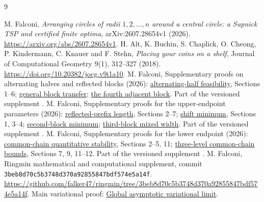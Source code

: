 \documentclass[11pt]{article}
\theoremstyle{definition}\newtheorem{definition}[theorem]{Definition}
\theoremstyle{remark}\newtheorem{remark}[theorem]{Remark}
\begin{document}
\begin{thebibliography}{9}
\small\raggedright
{} M. Falconi, \emph{Arranging circles of radii $1,2,\ldots,n$
around a central circle: a Supnick TSP and certified finite optima},
arXiv:2607.28654v1 (2026).
\url{https://arxiv.org/abs/2607.28654v1}.
 H. Alt, K. Buchin, S. Chaplick, O. Cheong, P. Kindermann,
C. Knauer and F. Stehn, \emph{Placing your coins on a shelf}, Journal of
Computational Geometry 9(1), 312--327 (2018).
\url{https://doi.org/10.20382/jocg.v9i1a10}.
 M. Falconi, Supplementary proofs on alternating halves and
reflected blocks (2026):
\href{https://github.com/falker47/ringmin/blob/3beb8d70c5b3748d370a92855847bdf574e5a14f/research/PERMUTED_ALTERNATING_HALVES.md}{alternating-half feasibility}, Sections 1--6;
\href{https://github.com/falker47/ringmin/blob/3beb8d70c5b3748d370a92855847bdf574e5a14f/research/PERMUTED_HALVES_GENERAL_BLOCK_TRANSFER.md}{general block transfer};
\href{https://github.com/falker47/ringmin/blob/3beb8d70c5b3748d370a92855847bdf574e5a14f/research/PERMUTED_HALVES_FOURTH_ADJACENT_BLOCK.md}{the fourth adjacent block}.
Part of the versioned supplement \cite{supplement}.
 M. Falconi, Supplementary proofs for the upper-endpoint
parameters (2026):
\href{https://github.com/falker47/ringmin/blob/3beb8d70c5b3748d370a92855847bdf574e5a14f/research/PERMUTED_HALVES_REFLECTED_PREFIX_LAMBDA.md}{reflected-prefix length}, Sections 2--7;
\href{https://github.com/falker47/ringmin/blob/3beb8d70c5b3748d370a92855847bdf574e5a14f/research/PERMUTED_HALVES_REFLECTED_PREFIX_ALPHA_MINIMUM.md}{shift minimum}, Sections 1, 3--4;
\href{https://github.com/falker47/ringmin/blob/3beb8d70c5b3748d370a92855847bdf574e5a14f/research/PERMUTED_HALVES_SECOND_BLOCK_BOUNDARY_MINIMUM.md}{second-block minimum};
\href{https://github.com/falker47/ringmin/blob/3beb8d70c5b3748d370a92855847bdf574e5a14f/research/PERMUTED_HALVES_THIRD_BLOCK_MIXED_WIDTH.md}{third-block mixed width}.
Part of the versioned supplement \cite{supplement}.
 M. Falconi, Supplementary proofs for the lower endpoint (2026):
\href{https://github.com/falker47/ringmin/blob/3beb8d70c5b3748d370a92855847bdf574e5a14f/research/COMMON_CHAIN_QUANTITATIVE_STABILITY.md}{common-chain quantitative stability}, Sections 2--5, 11;
\href{https://github.com/falker47/ringmin/blob/3beb8d70c5b3748d370a92855847bdf574e5a14f/research/THREE_LEVEL_COMMON_CHAIN.md}{three-level common-chain bounds}, Sections 7, 9, 11--12.
Part of the versioned supplement \cite{supplement}.
 M. Falconi, Ringmin mathematical and computational
supplement, commit \texttt{3beb8d70c5b3748d370a92855847bdf574e5a14f}.
\url{https://github.com/falker47/ringmin/tree/3beb8d70c5b3748d370a92855847bdf574e5a14f}.
Main variational proof:
\href{https://github.com/falker47/ringmin/blob/3beb8d70c5b3748d370a92855847bdf574e5a14f/research/GLOBAL_ASYMPTOTIC_VARIATIONAL_LIMIT.md}{Global asymptotic variational limit}.
\end{thebibliography}
\end{document}
